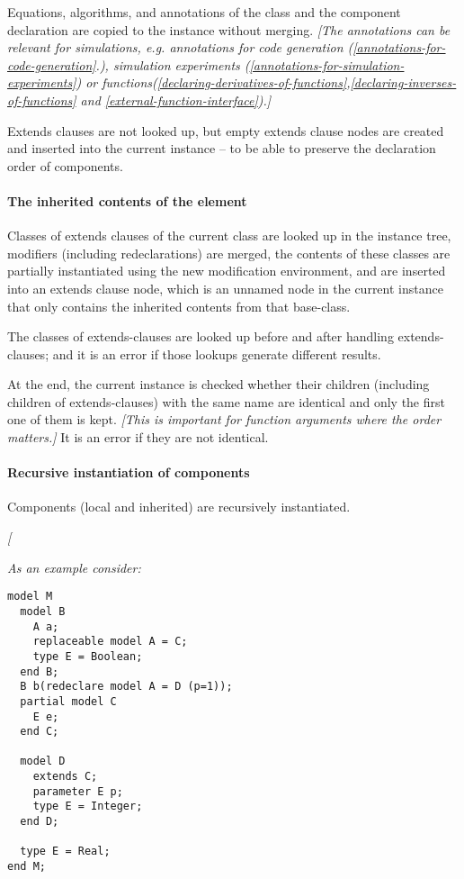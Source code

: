 Equations, algorithms, and annotations of the class and the component
declaration are copied to the instance without merging. \emph{{[}The
annotations can be relevant for simulations, e.g. annotations for code
generation (\ref{annotations-for-code-generation}.), 
simulation experiments (\ref{annotations-for-simulation-experiments}) 
or functions(\ref{declaring-derivatives-of-functions},\ref{declaring-inverses-of-functions} and \ref{external-function-interface}).{]}}

Extends clauses are not looked up, but empty extends clause nodes are
created and inserted into the current instance -- to be able to preserve
the declaration order of components.

\paragraph{The inherited contents of the element}

Classes of extends clauses of the current class are looked up in the
instance tree, modifiers (including redeclarations) are merged, the
contents of these classes are partially instantiated using the new
modification environment, and are inserted into an extends clause node,
which is an unnamed node in the current instance that only contains the
inherited contents from that base-class.

The classes of extends-clauses are looked up before and after handling
extends-clauses; and it is an error if those lookups generate different
results.

At the end, the current instance is checked whether their children
(including children of extends-clauses) with the same name are identical
and only the first one of them is kept. \emph{{[}This is important for
function arguments where the order matters.{]}} It is an error if they
are not identical.

\paragraph{Recursive instantiation of components}

Components (local and inherited) are recursively instantiated.

\emph{{[}}

\emph{As an example consider: }
\begin{lstlisting}[language=modelica]
model M
  model B
    A a;
    replaceable model A = C;
    type E = Boolean;
  end B;
  B b(redeclare model A = D (p=1));
  partial model C
    E e;
  end C;

  model D
    extends C;
    parameter E p;
    type E = Integer;
  end D;

  type E = Real;
end M;
\end{lstlisting}

